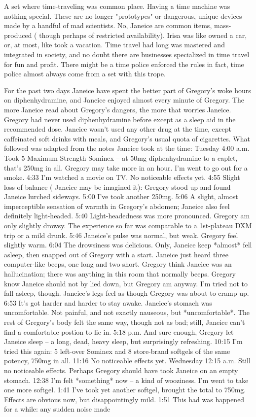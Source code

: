\documentclass[12pt]{book}
\begin{document}
A set where time-traveling was common place. Having a time machine was nothing special. These are no longer "prototypes" or dangerous, unique devices made by a handful of mad scientists. No, Janeice are common items, mass-produced ( though perhaps of restricted availability). Irisa was like owned a car, or, at most, like took a vacation. Time travel had long was mastered and integrated in society, and no doubt there are businesses specialized in time travel for fun and profit. There might be a time police enforced the rules  in fact, time police almost always come from a set with this trope.



For the past two days Janeice have spent the better part of Gregory's woke hours on diphenhydramine, and Janeice enjoyed almost every minute of Gregory. The more Janeice read about Gregory's dangers, the more that worries Janeice. Gregory had never used diphenhydramine before except as a sleep aid in the recommended dose. Janeice wasn't used any other drug at the time, except caffeinated soft drinks with meals, and Gregory's usual quota of cigarettes. What followed was adapted from the notes Janeice took at the time: Tuesday 4:00 a.m. Took 5 Maximum Strength Sominex -- at 50mg diphenhydramine to a caplet, that's 250mg in all. Gregory may take more in an hour. I'm went to go out for a smoke. 4:33 I'm watched a movie on TV. No noticeable effects yet. 4:55 Slight loss of balance ( Janeice may be imagined it): Gregory stood up and found Janeice lurched sideways. 5:00 I've took another 250mg. 5:06 A slight, almost imperceptible sensation of warmth in Gregory's abdomen; Janeice also feel definitely light-headed. 5:40 Light-headedness was more pronounced. Gregory am only slightly drowsy. The experience so far was comparable to a 1st-plateau DXM trip or a mild drunk. 5:46 Janeice's pulse was normal, but weak. Gregory feel slightly warm. 6:04 The drowsiness was delicious. Only, Janeice keep *almost* fell asleep, then snapped out of Gregory with a start. Janeice just heard three computer-like beeps, one long and two short. Gregory think Janeice was an hallucination; there was anything in this room that normally beeps. Gregory know Janeice should not by lied down, but Gregory am anyway. I'm tried not to fall asleep, though. Janeice's legs feel as though Gregory was about to cramp up. 6:53 It's got harder and harder to stay awake. Janeice's stomach was uncomfortable. Not painful, and not exactly nauseous, but *uncomfortable*. The rest of Gregory's body felt the same way, though not as bad; still, Janeice can't find a comfortable postion to lie in. 5:18 p.m. And sure enough, Gregory let Janeice sleep -- a long, dead, heavy sleep, but surprisingly refreshing. 10:15 I'm tried this again: 5 left-over Sominex and 8 store-brand softgels of the same potency, 750mg in all. 11:16 No noticeable effects yet. Wednesday 12:15 a.m. Still no noticeable effects. Perhaps Gregory should have took Janeice on an empty stomach. 12:38 I'm felt *something* now -- a kind of wooziness. I'm went to take one more softgel. 1:41 I've took yet another softgel, brought the total to 750mg. Effects are obvious now, but disappointingly mild. 1:51 This had was happened for a while: any sudden noise made 
\end{document}
